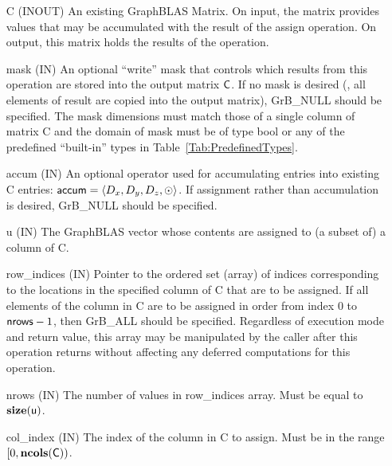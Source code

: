 \begin{itemize}[leftmargin=1.1in]
    \item[{\sf C}]    ({\sf INOUT}) An existing GraphBLAS Matrix.  On input,
    the matrix provides values that may be accumulated with the result of the
    assign operation.  On output, this matrix holds the results of the
    operation.

    \item[{\sf mask}]  ({\sf IN}) An optional ``write'' mask that controls which
    results from this operation are stored into the output matrix
    ${\sf C}$.  If no mask is desired (\ie, all elements
    of result are copied into the output matrix), {\sf GrB\_NULL}
    should be specified. The mask dimensions must match those of a single column
    of matrix {\sf C} and the domain of {\sf mask} must be
    of type {\sf bool} or any of the predefined ``built-in'' types in
    Table~\ref{Tab:PredefinedTypes}.
    
    \item[{\sf accum}]    ({\sf IN}) An optional operator used for accumulating
    entries into existing {\sf C} entries: ${\sf accum} = \langle D_x,
    D_y, D_z,\odot \rangle$. If assignment rather than accumulation is
    desired, {\sf GrB\_NULL} should be specified.

    \item[{\sf u}]       ({\sf IN}) The GraphBLAS vector whose contents are 
    assigned to (a subset of) a column of {\sf C}.

    \item[{\sf row\_indices}]  ({\sf IN}) Pointer to the ordered set (array) of 
    indices corresponding to the locations in the specified column of {\sf C} 
    that are to be assigned.  If all elements of the column in {\sf C} are to be 
    assigned in order from index $0$ to ${\sf nrows} - 1$, then {\sf GrB\_ALL} should be 
    specified.  Regardless of execution mode and return value, this array may be
    manipulated by the caller after this operation returns without affecting any 
    deferred computations for this operation.
    
    \item[{\sf nrows}] ({\sf IN}) The number of values in {\sf row\_indices} array.
    Must be equal to $\bold{size}({\sf u})$.
    
    \item[{\sf col\_index}]  ({\sf IN}) The index of the column in {\sf C} to 
    assign. Must be in the range $[0, \bold{ncols}({\sf C}))$.


\end{itemize}
